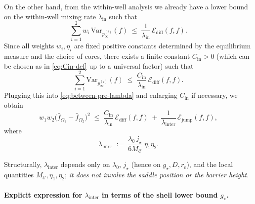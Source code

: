 On the other hand, from the within-well analysis we already have a lower bound
on the within-well mixing rate \(\lambda_{\mathrm{in}}\) such that
\begin{equation}\label{eq:Step-in}
\sum_{i=1}^2 w_i\,\mathrm{Var}_{p_\infty^{(i)}}(f)
\;\le\;
\frac{1}{\lambda_{\mathrm{in}}}\,\mathcal E_{\mathrm{diff}}(f,f).
\end{equation}
Since all weights \(w_i,\eta_i\) are fixed positive constants determined by the
equilibrium measure and the choice of cores, there exists a finite constant
\(C_{\mathrm{in}}>0\) (which can be chosen as in \eqref{eq:Cin-def} up to a
universal factor) such that
\[
\sum_{i=1}^2\mathrm{Var}_{p_\infty^{(i)}}(f)
\;\le\;
\frac{C_{\mathrm{in}}}{\lambda_{\mathrm{in}}}\,\mathcal E_{\mathrm{diff}}(f,f).
\]
Plugging this into \eqref{eq:between-pre-lambda} and enlarging
\(C_{\mathrm{in}}\) if necessary, we obtain
\begin{equation}\label{eq:between-controlled}
w_1w_2\bigl(\bar f_{\Omega_1}-\bar f_{\Omega_2}\bigr)^2
\;\le\;
\frac{C_{\mathrm{in}}}{\lambda_{\mathrm{in}}}\,
\mathcal E_{\mathrm{diff}}(f,f)
\;+\;
\frac{1}{\lambda_{\mathrm{inter}}}\,
\mathcal E_{\mathrm{jump}}(f,f),
\end{equation}
where
\begin{equation}\label{eq:lambda-inter-explicit}
\lambda_{\mathrm{inter}}
\;:=\;
\frac{\lambda_0\,j_\star}{6M_{\mathcal C}}\;\eta_1\eta_2.
\end{equation}

Structurally, \(\lambda_{\mathrm{inter}}\) depends only on
\(\lambda_0\), \(j_\star\) (hence on \(g_\star,D,r_{\mathrm c}\)),
and the local quantities \(M_{\mathcal C},\eta_1,\eta_2\);
\emph{it does not involve the saddle position or the barrier height.}

\paragraph{ Explicit expression for \texorpdfstring{$\lambda_{\mathrm{inter}}$}{lambda\_inter} in terms of the shell lower bound \texorpdfstring{$g_\star$}{g\_*}.}

